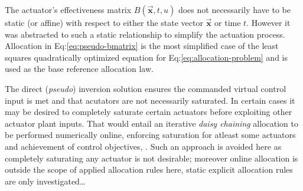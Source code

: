 \par
The actuator's effectiveness matrix $B(\vec{\mathbf{x}},t,u)$ does not necessarily have to be static (or affine) with respect to either the state vector $\vec{\mathbf{x}}$ or time $t$. However it was abstracted to such a static relationship to simplify the actuation process. Allocation in Eq:\ref{eq:pseudo-bmatrix} is the most simplified case of the least squares quadratically optimized equation for Eq:\ref{eq:allocation-problem} and is used as the base reference allocation law.
\par
The direct (\emph{pseudo}) inversion solution ensures the commanded virtual control input is met and that acutators are not necessarily saturated. In certain cases it may be desired to completely saturate certain actuators before exploiting other actuator plant inputs. That would entail an iterative \emph{daisy chaining} allocation to be performed numerically online, enforcing saturation for atleast some actuators and achievement of control objectives, \cite{allocation}. Such an approach is avoided here as completely saturating any actuator is not desirable; moreover online allocation is outside the scope of applied allocation rules here, static explicit allocation rules are only investigated\ldots
